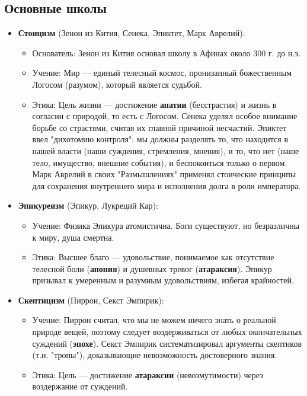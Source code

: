 \documentclass[12pt,a4paper]{article}
\begin{document}
	\subsection{Основные школы}
	\begin{itemize}
		\item \textbf{Стоицизм} (Зенон из Кития, Сенека, Эпиктет, Марк Аврелий):
		\begin{itemize}
			\item Основатель: Зенон из Кития основал школу в Афинах около 300 г. до н.э.
			\item Учение: Мир --- единый телесный космос, пронизанный божественным Логосом (разумом), который является судьбой.
			\item Этика: Цель жизни --- достижение \textbf{апатии} (бесстрастия) и жизнь в согласии с природой, то есть с Логосом. Сенека уделял особое внимание борьбе со страстями, считая их главной причиной несчастий. Эпиктет ввел "дихотомию контроля": мы должны разделять то, что находится в нашей власти (наши суждения, стремления, мнения), и то, что нет (наше тело, имущество, внешние события), и беспокоиться только о первом. Марк Аврелий в своих "Размышлениях" применял стоические принципы для сохранения внутреннего мира и исполнения долга в роли императора.
		\end{itemize}
		
		\item \textbf{Эпикуреизм} (Эпикур, Лукреций Кар):
		\begin{itemize}
			\item Учение: Физика Эпикура атомистична. Боги существуют, но безразличны к миру, душа смертна.
			\item Этика: Высшее благо --- удовольствие, понимаемое как отсутствие телесной боли (\textbf{апония}) и душевных тревог (\textbf{атараксия}). Эпикур призывал к умеренным и разумным удовольствиям, избегая крайностей.
		\end{itemize}
		
		\item \textbf{Скептицизм} (Пиррон, Секст Эмпирик):
		\begin{itemize}
			\item Учение: Пиррон считал, что мы не можем ничего знать о реальной природе вещей, поэтому следует воздерживаться от любых окончательных суждений (\textbf{эпохе}). Секст Эмпирик систематизировал аргументы скептиков (т.н. "тропы"), доказывающие невозможность достоверного знания.
			\item Этика: Цель --- достижение \textbf{атараксии} (невозмутимости) через воздержание от суждений.
		\end{itemize}
		

\end{itemize}
\end{document}
